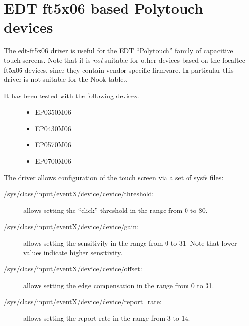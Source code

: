 \documentclass[a4paper,8pt,english]{sphinxmanual}
\begin{document}
\section{EDT ft5x06 based Polytouch devices}
\label{input/devices/edt-ft5x06::doc}\label{input/devices/edt-ft5x06:edt-ft5x06-based-polytouch-devices}
The edt-ft5x06 driver is useful for the EDT ``Polytouch'' family of capacitive
touch screens. Note that it is \emph{not} suitable for other devices based on the
focaltec ft5x06 devices, since they contain vendor-specific firmware. In
particular this driver is not suitable for the Nook tablet.
\begin{description}
\item[{It has been tested with the following devices:}] \leavevmode\begin{itemize}
\item {} 
EP0350M06

\item {} 
EP0430M06

\item {} 
EP0570M06

\item {} 
EP0700M06

\end{itemize}

\end{description}

The driver allows configuration of the touch screen via a set of sysfs files:
\begin{description}
\item[{/sys/class/input/eventX/device/device/threshold:}] \leavevmode
allows setting the ``click''-threshold in the range from 0 to 80.

\item[{/sys/class/input/eventX/device/device/gain:}] \leavevmode
allows setting the sensitivity in the range from 0 to 31. Note that
lower values indicate higher sensitivity.

\item[{/sys/class/input/eventX/device/device/offset:}] \leavevmode
allows setting the edge compensation in the range from 0 to 31.

\item[{/sys/class/input/eventX/device/device/report\_rate:}] \leavevmode
allows setting the report rate in the range from 3 to 14.

\end{description}
\end{document}
